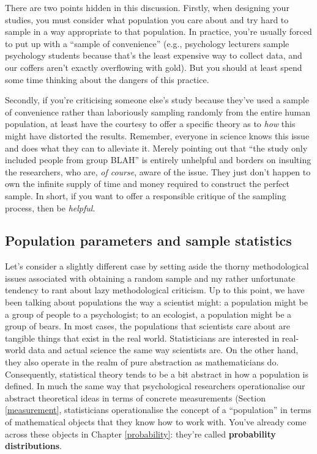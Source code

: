 \documentclass[
  11pt,
  a4paper,
  twoside,symmetric,openright]{book}
\theoremstyle{break}
\theoremstyle{break}
\begin{document}
There are two points hidden in this discussion. Firstly, when designing your studies, you must consider what population you care about and try hard to sample in a way appropriate to that population. In practice, you're usually forced to put up with a ``sample of convenience'' (e.g., psychology lecturers sample psychology students because that's the least expensive way to collect data, and our coffers aren't exactly overflowing with gold). But you should at least spend some time thinking about the dangers of this practice.

Secondly, if you're criticising someone else's study because they've used a sample of convenience rather than laboriously sampling randomly from the entire human population, at least have the courtesy to offer a specific theory as to \emph{how} this might have distorted the results. Remember, everyone in science knows this issue and does what they can to alleviate it. Merely pointing out that ``the study only included people from group BLAH'' is entirely unhelpful and borders on insulting the researchers, who are, \emph{of course}, aware of the issue. They just don't happen to own the infinite supply of time and money required to construct the perfect sample. In short, if you want to offer a responsible critique of the sampling process, then be \emph{helpful}.

\subsection{Population parameters and sample statistics}\label{population-parameters-and-sample-statistics}

Let's consider a slightly different case by setting aside the thorny methodological issues associated with obtaining a random sample and my rather unfortunate tendency to rant about lazy methodological criticism. Up to this point, we have been talking about populations the way a scientist might: a population might be a group of people to a psychologist; to an ecologist, a population might be a group of bears. In most cases, the populations that scientists care about are tangible things that exist in the real world. Statisticians are interested in real-world data and actual science the same way scientists are. On the other hand, they also operate in the realm of pure abstraction as mathematicians do. Consequently, statistical theory tends to be a bit abstract in how a population is defined. In much the same way that psychological researchers operationalise our abstract theoretical ideas in terms of concrete measurements (Section \ref{measurement}, statisticians operationalise the concept of a ``population'' in terms of mathematical objects that they know how to work with. You've already come across these objects in Chapter \ref{probability}: they're called \textbf{probability distributions}.
\end{document}
